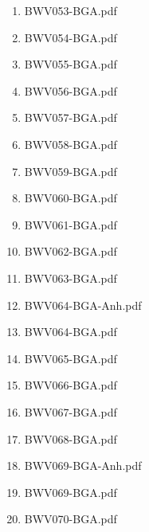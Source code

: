 \documentclass[11pt]{article}
\begin{document}
\begin{enumerate}
\begin{enumerate}
\begin{enumerate}
\item BWV053-BGA.pdf
\label{sec-1-1-1-1-44-6-7-1-62}

\item BWV054-BGA.pdf
\label{sec-1-1-1-1-44-6-7-1-63}

\item BWV055-BGA.pdf
\label{sec-1-1-1-1-44-6-7-1-64}

\item BWV056-BGA.pdf
\label{sec-1-1-1-1-44-6-7-1-65}

\item BWV057-BGA.pdf
\label{sec-1-1-1-1-44-6-7-1-66}

\item BWV058-BGA.pdf
\label{sec-1-1-1-1-44-6-7-1-67}

\item BWV059-BGA.pdf
\label{sec-1-1-1-1-44-6-7-1-68}

\item BWV060-BGA.pdf
\label{sec-1-1-1-1-44-6-7-1-69}

\item BWV061-BGA.pdf
\label{sec-1-1-1-1-44-6-7-1-70}

\item BWV062-BGA.pdf
\label{sec-1-1-1-1-44-6-7-1-71}

\item BWV063-BGA.pdf
\label{sec-1-1-1-1-44-6-7-1-72}

\item BWV064-BGA-Anh.pdf
\label{sec-1-1-1-1-44-6-7-1-73}

\item BWV064-BGA.pdf
\label{sec-1-1-1-1-44-6-7-1-74}

\item BWV065-BGA.pdf
\label{sec-1-1-1-1-44-6-7-1-75}

\item BWV066-BGA.pdf
\label{sec-1-1-1-1-44-6-7-1-76}

\item BWV067-BGA.pdf
\label{sec-1-1-1-1-44-6-7-1-77}

\item BWV068-BGA.pdf
\label{sec-1-1-1-1-44-6-7-1-78}

\item BWV069-BGA-Anh.pdf
\label{sec-1-1-1-1-44-6-7-1-79}

\item BWV069-BGA.pdf
\label{sec-1-1-1-1-44-6-7-1-80}

\item BWV070-BGA.pdf
\label{sec-1-1-1-1-44-6-7-1-81}


\end{enumerate}
\end{enumerate}
\end{enumerate}
\end{document}
